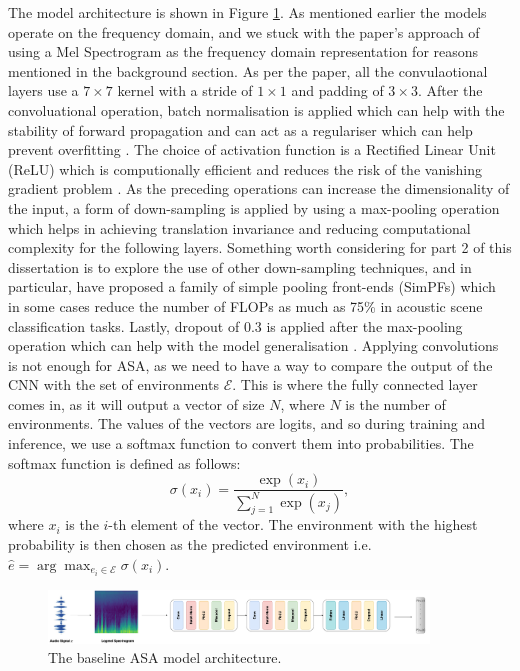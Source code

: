 \documentclass[logo,bsc,singlespacing,parskip,online]{infthesis}
\begin{document}
The model architecture is shown in Figure \ref{fig:cnn-model-architecture}. As 
mentioned earlier the models operate on the frequency domain, and 
we stuck with the paper's approach of using a Mel Spectrogram as the 
frequency domain representation for reasons mentioned in the background section. 
As per the paper, all the convulaotional layers use a $7 \times 7$ kernel
with a stride of $1 \times 1$ and padding of $3 \times 3$. After the convoluational operation, 
batch normalisation is applied which can help with the stability of forward propagation 
and can act as a regulariser which can help prevent overfitting \cite{prince2023understanding}.
The choice of activation function is a Rectified Linear Unit (ReLU) which is computionally 
efficient and reduces the risk of the vanishing gradient problem \cite{prince2023understanding}.
As the preceding operations can increase the dimensionality of the input, a form of down-sampling is applied by using a max-pooling operation which helps in achieving 
translation invariance and reducing computational complexity for the following layers. Something worth considering for 
part 2 of this dissertation is to explore the use of other down-sampling techniques, and in particular,
\citet{liu_simple_2023} have proposed a family of simple pooling front-ends (SimPFs) 
which in some cases reduce the number of FLOPs as much as 75\% in acoustic scene classification tasks. 
Lastly, dropout of 0.3 is applied after the max-pooling operation which can help with 
the model generalisation \cite{prince2023understanding}.
Applying convolutions is not enough for ASA, 
as we need to have a way to compare the output of the CNN with the set of environments \(\mathcal{E}\).
This is where the fully connected layer comes in, as it will output a vector of size \(N\), where \(N\) is the number of environments.
The values of the vectors are logits, and so during training and inference, we use a softmax function to convert them into probabilities.
The softmax function is defined as follows:
\[
\sigma(x_i) = \frac{\exp(x_i)}{\sum_{j=1}^{N} \exp(x_j)},
\]
where \(x_i\) is the \(i\)-th element of the vector.
The environment with the highest probability is then chosen as the predicted environment 
i.e. \(\hat{e} = \arg\max_{e_i \in \mathcal{E}} \sigma(x_i)\).


\begin{figure}[h]
   \centering
   \includegraphics[width=0.9\textwidth]{cnn-diagram.png}
   \caption{The baseline ASA model architecture.}
   \label{fig:cnn-model-architecture}
\end{figure}
\end{document}
